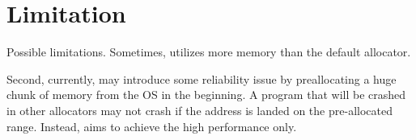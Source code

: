 \section{Limitation}
\label{sec:limit}

Possible limitations. Sometimes, \NM{} utilizes more memory than the default allocator. 

Second, currently, \NM{} may introduce some reliability issue by preallocating a huge chunk of memory from the OS in the beginning. A program that will be crashed in other allocators may not crash if the address is landed on the pre-allocated range. Instead, \NM{} aims to achieve the high performance only. 
